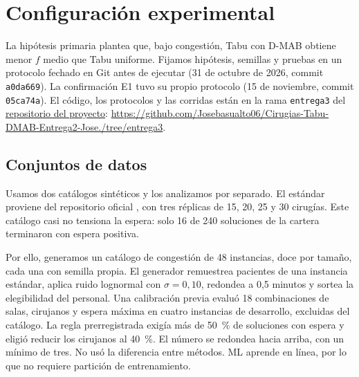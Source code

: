 %   
\section{Configuración experimental}
\label{sec:experimental}\label{set-ini}

La hipótesis primaria plantea que, bajo congestión, Tabu con D-MAB obtiene menor $f$
medio que Tabu uniforme. Fijamos hipótesis, semillas y pruebas en un protocolo
fechado en Git antes de ejecutar (31 de octubre de 2026, commit \texttt{a0da669}).
La confirmación E1 tuvo su propio protocolo (15 de noviembre, commit \texttt{05ca74a}).
El código, los protocolos y las corridas están en la rama \texttt{entrega3} del
\href{https://github.com/Josebasualto06/Cirugias-Tabu-DMAB-Entrega2-Jose./tree/entrega3}{repositorio del proyecto}:
{\footnotesize\url{https://github.com/Josebasualto06/Cirugias-Tabu-DMAB-Entrega2-Jose./tree/entrega3}}.

\subsection{Conjuntos de datos}
\label{subsec:datos}
Usamos dos catálogos sintéticos y los analizamos por separado. El estándar proviene
del repositorio oficial \parencite{saicooh2026}, con tres réplicas de 15, 20, 25 y
30 cirugías. Este catálogo casi no tensiona la espera: solo 16 de 240 soluciones
de la cartera terminaron con espera positiva.

Por ello, generamos un catálogo de congestión de 48 instancias, doce por tamaño,
cada una con semilla propia. El generador remuestrea pacientes de una instancia
estándar, aplica ruido lognormal con $\sigma=0{,}10$, redondea a 0,5 minutos y
sortea la elegibilidad del personal. Una calibración previa evaluó 18 combinaciones
de salas, cirujanos y espera máxima en cuatro instancias de desarrollo, excluidas
del catálogo. La regla prerregistrada exigía más de 50~\% de soluciones con espera
y eligió reducir los cirujanos al 40~\%. El número se redondea hacia arriba, con un
mínimo de tres. No usó la diferencia entre métodos. ML aprende en línea, por lo que no requiere partición de
entrenamiento.

